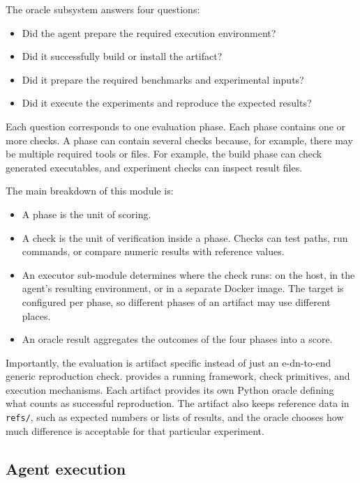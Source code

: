 The oracle subsystem answers four questions:

\begin{itemize}
  \item Did the agent prepare the required execution environment?
  \item Did it successfully build or install the artifact?
  \item Did it prepare the required benchmarks and experimental inputs?
  \item Did it execute the experiments and reproduce the expected results?
\end{itemize}

Each question corresponds to one evaluation phase. 
Each phase contains one or more checks.
A phase can contain several checks because, for example, there 
  may be multiple required tools or files.
For example, the build phase can check generated executables, and 
  experiment checks can inspect result files.

The main breakdown of this module is:

\begin{itemize}
  \item A phase is the unit of scoring.
  \item A check is the unit of verification inside a phase. Checks can test paths,
    run commands, or compare numeric results with reference values.
  \item An executor sub-module determines where the check runs: on the host, in the agent's resulting environment, or in a separate Docker image.
    The target is configured per phase, so different phases of an artifact may use different places.
  \item An oracle result aggregates the outcomes of the four phases into a score.
\end{itemize}

Importantly, the evaluation is artifact specific instead of just an e-dn-to-end generic 
  reproduction check.
\aebench provides a running framework, check primitives, and execution mechanisms.
Each artifact provides its own Python oracle defining what counts as successful reproduction.
The artifact also keeps reference data in \texttt{refs/}, such as expected numbers or lists of results,
  and the oracle chooses how much difference is acceptable for that particular experiment.

\subsection{Agent execution}

